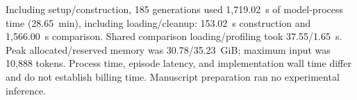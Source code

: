 \begin{table}[!t]
\caption{Recorded comparison costs summed over 24 cases per condition. Episode time includes analytical and rendering work; shared model loading/profiling is separate. $^{a}$Exact/equivalent repeated requests use the frozen signatures; equivalent requests share feature, group and window meaning. Input/output token totals count repeated context, failures, and repairs.}
\label{tab:costs}
\centering\setlength{\tabcolsep}{3pt}

\end{table}

Including setup/construction, 185 generations used 1,719.02~s of model-process time (28.65~min), including loading/cleanup: 153.02~s construction and 1,566.00~s comparison. Shared comparison loading/profiling took 37.55/1.65~s. Peak allocated/reserved memory was 30.78/35.23~GiB; maximum input was 10,888 tokens. Process time, episode latency, and implementation wall time differ and do not establish billing time. Manuscript preparation ran no experimental inference.
